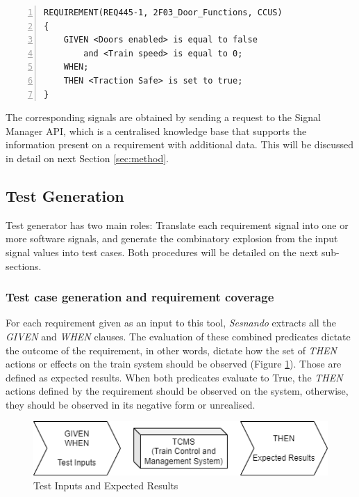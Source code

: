 \begin{Verbatim}[xleftmargin=12mm, numbers=left]
REQUIREMENT(REQ445-1, 2F03_Door_Functions, CCUS) 
{
	GIVEN <Doors enabled> is equal to false
		and <Train speed> is equal to 0;
	WHEN;
	THEN <Traction Safe> is set to true;
}
\end{Verbatim}

The corresponding signals are obtained by sending a request to the Signal Manager API, which is a centralised knowledge base that supports the information present on a requirement with additional data. This will be discussed in detail on next Section \ref{sec:method}.


\subsection{Test Generation}
\label{subsec:test_generation}

Test generator has two main roles: Translate each requirement signal into one or more software signals, and generate the combinatory explosion from the input signal values into test cases. Both procedures will be detailed on the next sub-sections.


\subsubsection{Test case generation and requirement coverage}
\label{subsubsec:test_cases}


For each requirement given as an input to this tool, \textit{Sesnando} extracts all the \textit{GIVEN} and \textit{WHEN} clauses. The evaluation of these combined predicates dictate the outcome of the requirement, in other words, dictate how the set of \textit{THEN} actions or effects on the train system should be observed (Figure \ref{fig:ti_er}). Those are defined as expected results. When both predicates evaluate to True, the \textit{THEN} actions defined by the requirement should be observed on the system, otherwise, they should be observed in its negative form or unrealised.\\

\begin{figure}[H]
    \centering
    \includegraphics[scale=0.75]{images/In_out_TI_ER.png}
    \caption{Test Inputs and Expected Results}
    \label{fig:ti_er}
\end{figure}

